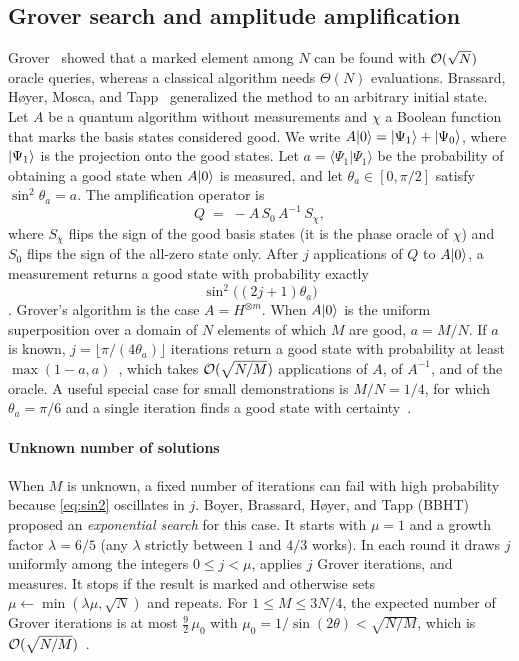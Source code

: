 \subsection{Grover search and amplitude amplification}\label{sec:bg-grover}

Grover~\cite{grover1996} showed that a marked element among $N$ can be found with $\mathcal{O}(\sqrt{N})$ oracle queries, whereas a classical algorithm needs $\Theta(N)$ evaluations. Brassard, H{\o}yer, Mosca, and Tapp~\cite{bhmt2002} generalized the method to an arbitrary initial state. Let $A$ be a quantum algorithm without measurements and $\chi$ a Boolean function that marks the basis states considered good. We write $A\lvert 0 \rangle=\lvert \Psi_1 \rangle+\lvert \Psi_0 \rangle$, where $\lvert \Psi_1 \rangle$ is the projection onto the good states. Let $a=\langle\Psi_1|\Psi_1\rangle$ be the probability of obtaining a good state when $A\lvert 0 \rangle$ is measured, and let $\theta_a\in[0,\pi/2]$ satisfy $\sin^{2}\theta_a=a$. The amplification operator is
\begin{equation}\label{eq:Q}
  Q \;=\; -A\,S_0\,A^{-1}\,S_\chi ,
\end{equation}
where $S_\chi$ flips the sign of the good basis states (it is the phase oracle of $\chi$) and $S_0$ flips the sign of the all-zero state only. After $j$ applications of $Q$ to $A\lvert 0 \rangle$, a measurement returns a good state with probability exactly
\begin{equation}\label{eq:sin2}
  \sin^{2}\bigl((2j+1)\theta_a\bigr)
\end{equation}
\cite[Section~2]{bhmt2002}. Grover's algorithm is the case $A=H^{\otimes m}$. When $A\lvert 0 \rangle$ is the uniform superposition over a domain of $N$ elements of which $M$ are good, $a=M/N$. If $a$ is known, $j=\lfloor\pi/(4\theta_a)\rfloor$ iterations return a good state with probability at least $\max(1-a,a)$~\cite[Theorem~2]{bhmt2002}, which takes $\mathcal{O}(\sqrt{N/M})$ applications of $A$, of $A^{-1}$, and of the oracle. A useful special case for small demonstrations is $M/N=1/4$, for which $\theta_a=\pi/6$ and a single iteration finds a good state with certainty~\cite[Section~3.1]{bbht1998}.

\paragraph{Unknown number of solutions} When $M$ is unknown, a fixed number of iterations can fail with high probability because \eqref{eq:sin2} oscillates in $j$. Boyer, Brassard, H{\o}yer, and Tapp (BBHT)~\cite{bbht1998} proposed an \emph{exponential search} for this case. It starts with $\mu=1$ and a growth factor $\lambda=6/5$ (any $\lambda$ strictly between $1$ and $4/3$ works). In each round it draws $j$ uniformly among the integers $0\le j<\mu$, applies $j$ Grover iterations, and measures. It stops if the result is marked and otherwise sets $\mu\leftarrow\min(\lambda\mu,\sqrt{N})$ and repeats. For $1\le M\le 3N/4$, the expected number of Grover iterations is at most $\tfrac{9}{2}\,\mu_0$ with $\mu_0=1/\sin(2\theta)<\sqrt{N/M}$, which is $\mathcal{O}(\sqrt{N/M})$~\cite[Theorem~3]{bbht1998}.

